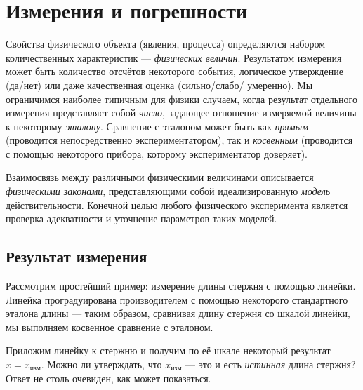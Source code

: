 \chapter{Измерения и погрешности}


Свойства физического объекта (явления, процесса) определяются набором
количественных характеристик --- \emph{физических величин}.
Результатом измерения может быть количество отсчётов некоторого события, логическое утверждение (да/нет) или даже качественная оценка (сильно/слабо/ умеренно). 
Мы ограничимся наиболее типичным для физики случаем, когда результат отдельного измерения представляет собой \emph{число}, задающее отношение измеряемой величины к некоторому \emph{эталону}.
Сравнение с эталоном может быть как \emph{прямым} (проводится непосредственно экспериментатором), так и \emph{косвенным} (проводится с помощью некоторого прибора, которому экспериментатор доверяет).

Взаимосвязь между различными физическими величинами описывается
\emph{физическими законами}, представляющими собой идеализированную
\emph{модель} действительности. Конечной целью любого физического
эксперимента является проверка адекватности и
уточнение параметров таких моделей.

\section{Результат измерения}

Рассмотрим простейший пример: измерение длины стержня
с помощью линейки. Линейка проградуирована производителем с помощью
некоторого стандартного эталона длины --- таким образом, сравнивая длину
стержня со шкалой линейки, мы выполняем косвенное сравнение с
эталоном.


Приложим линейку к стержню и получим по её шкале некоторый результат $x=x_{изм}$. Можно ли утверждать, что $x_{изм}$ --- это и есть \emph{истинная} длина стержня? Ответ не столь очевиден, как может показаться.

